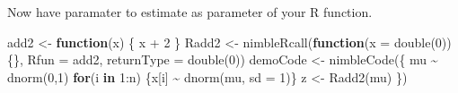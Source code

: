 \documentclass[
  12pt,
]{krantz}
\newenvironment{Shaded}{\begin{snugshade}}{\end{snugshade}}
\newcommand{\AttributeTok}[1]{\textcolor[rgb]{0.77,0.63,0.00}{#1}}
\newcommand{\ControlFlowTok}[1]{\textcolor[rgb]{0.13,0.29,0.53}{\textbf{#1}}}
\newcommand{\DecValTok}[1]{\textcolor[rgb]{0.00,0.00,0.81}{#1}}
\newcommand{\FunctionTok}[1]{\textcolor[rgb]{0.00,0.00,0.00}{#1}}
\newcommand{\NormalTok}[1]{#1}
\newcommand{\OtherTok}[1]{\textcolor[rgb]{0.56,0.35,0.01}{#1}}
\newcommand{\SpecialCharTok}[1]{\textcolor[rgb]{0.00,0.00,0.00}{#1}}
\newcommand{\StringTok}[1]{\textcolor[rgb]{0.31,0.60,0.02}{#1}}
\begin{document}
Now have paramater to estimate as parameter of your R function.

\begin{Shaded}
\begin{Highlighting}[]
\NormalTok{add2 }\OtherTok{\textless{}{-}} \ControlFlowTok{function}\NormalTok{(x) \{}
\NormalTok{   x }\SpecialCharTok{+} \DecValTok{2} 
\NormalTok{\}}
\NormalTok{Radd2 }\OtherTok{\textless{}{-}} \FunctionTok{nimbleRcall}\NormalTok{(}\ControlFlowTok{function}\NormalTok{(}\AttributeTok{x =} \FunctionTok{double}\NormalTok{(}\DecValTok{0}\NormalTok{))\{\}, }
                     \AttributeTok{Rfun =} \StringTok{\textquotesingle{}add2\textquotesingle{}}\NormalTok{,}
                     \AttributeTok{returnType =} \FunctionTok{double}\NormalTok{(}\DecValTok{0}\NormalTok{))}
\NormalTok{demoCode }\OtherTok{\textless{}{-}} \FunctionTok{nimbleCode}\NormalTok{(\{}
\NormalTok{  mu }\SpecialCharTok{\textasciitilde{}} \FunctionTok{dnorm}\NormalTok{(}\DecValTok{0}\NormalTok{,}\DecValTok{1}\NormalTok{)}
  \ControlFlowTok{for}\NormalTok{(i }\ControlFlowTok{in} \DecValTok{1}\SpecialCharTok{:}\NormalTok{n) \{x[i] }\SpecialCharTok{\textasciitilde{}} \FunctionTok{dnorm}\NormalTok{(mu, }\AttributeTok{sd =} \DecValTok{1}\NormalTok{)\} }
\NormalTok{  z }\OtherTok{\textless{}{-}} \FunctionTok{Radd2}\NormalTok{(mu)}
\NormalTok{\})}


\end{Highlighting}
\end{Shaded}
\end{document}
